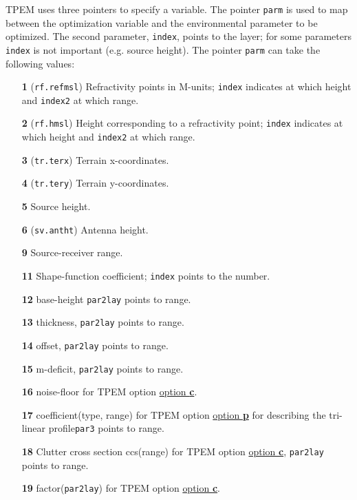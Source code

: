 \documentclass{saclantc}
\begin{document}
{\sf TPEM} uses three pointers to specify a variable.
The pointer {\tt parm} is used to map between the optimization variable and the
environmental parameter to be optimized. The second parameter, {\tt index}, points to the
layer; for some parameters {\tt index} is not important (e.g. source height).  
The pointer {\tt parm} can take the following values:


  \begin{itemize}
    \item[\bf 1] 
 ({\tt rf.refmsl})    Refractivity points in M-units;
                 {\tt index} indicates at which height and {\tt index2} at which range.
\vspace{-0.3cm}
    \item[\bf 2]  ({\tt rf.hmsl})  Height corresponding to a refractivity point;
                 {\tt index} indicates at which height and {\tt index2} at which range.
\vspace{-0.3cm}
    \item[\bf 3]  ({\tt tr.terx})  Terrain x-coordinates.
\vspace{-0.3cm}
    \item[\bf 4]  ({\tt tr.tery})  Terrain y-coordinates.
\vspace{-0.3cm}
    \item[\bf 5]  Source height.
\vspace{-0.3cm}
    \item[\bf 6]  ({\tt sv.antht})   Antenna height.
\vspace{-0.3cm}
    \item[\bf 9]  Source-receiver range.
\vspace{-0.3cm}
    \item[\bf 11] Shape-function coefficient; {\tt index} points to the number.
\vspace{-0.3cm}
    \item[\bf 12] base-height {\tt par2lay} points to range.
\vspace{-0.3cm}
    \item[\bf 13]  thickness,  {\tt par2lay} points to range.
\vspace{-0.3cm}
    \item[\bf 14]  offset,     {\tt par2lay} points to range.
\vspace{-0.3cm}
    \item[\bf 15]  m-deficit,  {\tt par2lay} points to range.
\vspace{-0.3cm}
    \item[\bf 16]  noise-floor  for TPEM option \underline{option {\bf c}}.
\vspace{-0.3cm}
    \item[\bf 17] coefficient(type, range)  for TPEM option
    \underline{option {\bf p}} for describing the tri-linear profile{\tt par3} points to range.
\vspace{-0.3cm}
    \item[\bf 18] Clutter cross section ccs(range) for TPEM option \underline{option {\bf c}},  {\tt par2lay} points to range.
\vspace{-0.3cm}
    \item[\bf 19] factor({\tt par2lay}) for TPEM option \underline{option {\bf c}}.
\end{itemize}
\end{document}
